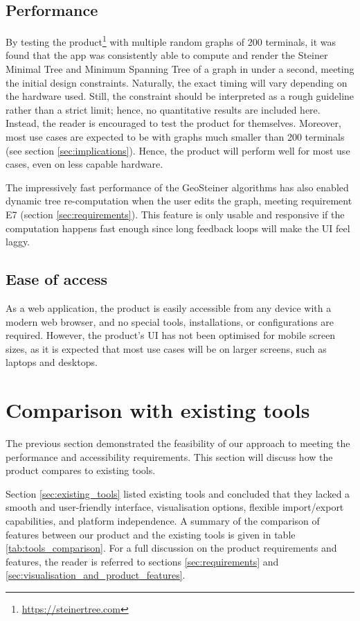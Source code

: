 \documentclass{l4proj}
\begin{document}
\subsection{Performance}
\label{sec:performance}
By testing the product\footnote{\url{https://steinertree.com}} with multiple random graphs of 200 terminals, it was found that the app was consistently able to compute and render the Steiner Minimal Tree and Minimum Spanning Tree of a graph in under a second, meeting the initial design constraints. Naturally, the exact timing will vary depending on the hardware used. Still, the constraint should be interpreted as a rough guideline rather than a strict limit; hence, no quantitative results are included here. Instead, the reader is encouraged to test the product for themselves. Moreover, most use cases are expected to be with graphs much smaller than 200 terminals (see section \ref{sec:implications}). Hence, the product will perform well for most use cases, even on less capable hardware.

The impressively fast performance of the GeoSteiner algorithms has also enabled dynamic tree re-computation when the user edits the graph, meeting requirement E7 (section \ref{sec:requirements}). This feature is only usable and responsive if the computation happens fast enough since long feedback loops will make the UI feel laggy.
\subsection{Ease of access}
As a web application, the product is easily accessible from any device with a modern web browser, and no special tools, installations, or configurations are required. However, the product's UI has not been optimised for mobile screen sizes, as it is expected that most use cases will be on larger screens, such as laptops and desktops.



\section{Comparison with existing tools}
The previous section demonstrated the feasibility of our approach to meeting the performance and accessibility requirements.
This section will discuss how the product compares to existing tools.

Section \ref{sec:existing_tools} listed existing tools and concluded that they lacked a smooth and user-friendly interface, visualisation options, flexible import/export capabilities, and platform independence. A summary of the comparison of features between our product and the existing tools is given in table \ref{tab:tools_comparison}. For a full discussion on the product requirements and features, the reader is referred to sections \ref{sec:requirements} and \ref{sec:visualisation_and_product_features}.
\end{document}
